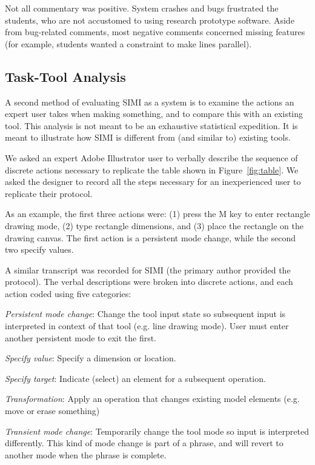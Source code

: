 \documentclass{article}
\begin{document}
Not all commentary was positive. System crashes and bugs frustrated
the students, who are not accustomed to using research prototype
software. Aside from bug-related comments, most negative comments
concerned missing features (for example, students wanted a constraint
to make lines parallel).

\subsection{Task-Tool Analysis}

A second method of evaluating SIMI as a system is to examine the
actions an expert user takes when making something, and to compare
this with an existing tool. This analysis is not meant to be an
exhaustive statistical expedition. It is meant to illustrate how SIMI
is different from (and similar to) existing tools.

We asked an expert Adobe Illustrator user to verbally describe the
sequence of discrete actions necessary to replicate the table shown
in Figure~\ref{fig:table}. We asked the designer to record all the
steps necessary for an inexperienced user to replicate their
protocol. 

As an example, the first three actions were: (1) press the M key to
enter rectangle drawing mode, (2) type rectangle dimensions, and (3)
place the rectangle on the drawing canvas. The first action is a
persistent mode change, while the second two specify values.

A similar transcript was recorded for SIMI (the primary author
provided the protocol). The verbal descriptions were broken into
discrete actions, and each action coded using five categories:

\textit{Persistent mode change}: Change the tool input state so
subsequent input is interpreted in context of that tool (e.g. line
drawing mode). User must enter another persistent mode to exit the
first.

\textit{Specify value}: Specify a dimension or location.

\textit{Specify target}: Indicate (select) an element for a subsequent
operation.

\textit{Transformation}: Apply an operation that changes existing
model elements (e.g. move or erase something)

\textit{Transient mode change}: Temporarily change the tool mode so
input is interpreted differently. This kind of mode change is part of
a phrase, and will revert to another mode when the phrase is complete.
\end{document}
